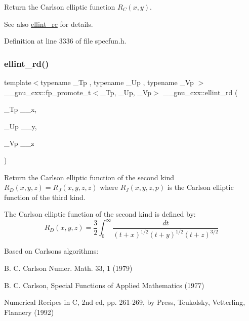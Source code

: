 Return the Carlson elliptic function $ R_C(x,y) $.

\begin{DoxySeeAlso}{See also}
\hyperlink{group__gnu__math__spec__func_ga7d3d42f5f71a74266be8aaca528056bf}{ellint\+\_\+rc} for details. 
\end{DoxySeeAlso}


Definition at line 3336 of file specfun.\+h.

\mbox{\label{group__gnu__math__spec__func_gad29dae6abc783c8fe952dba477e65309}} 
\subsubsection{\texorpdfstring{ellint\+\_\+rd()}{ellint\_rd()}}
{\footnotesize\ttfamily template$<$typename \+\_\+\+Tp , typename \+\_\+\+Up , typename \+\_\+\+Vp $>$ \\
\+\_\+\+\_\+gnu\+\_\+cxx\+::fp\+\_\+promote\+\_\+t$<$\+\_\+\+Tp, \+\_\+\+Up, \+\_\+\+Vp$>$ \+\_\+\+\_\+gnu\+\_\+cxx\+::ellint\+\_\+rd (\begin{DoxyParamCaption}\item[{\+\_\+\+Tp}]{\+\_\+\+\_\+x,  }\item[{\+\_\+\+Up}]{\+\_\+\+\_\+y,  }\item[{\+\_\+\+Vp}]{\+\_\+\+\_\+z }\end{DoxyParamCaption})\hspace{0.3cm}{\ttfamily [inline]}}

Return the Carlson elliptic function of the second kind $ R_D(x,y,z) = R_J(x,y,z,z) $ where $ R_J(x,y,z,p) $ is the Carlson elliptic function of the third kind.

The Carlson elliptic function of the second kind is defined by\+: \[ R_D(x,y,z) = \frac{3}{2} \int_0^\infty \frac{dt}{(t + x)^{1/2}(t + y)^{1/2}(t + z)^{3/2}} \]

Based on Carlson\textquotesingle{}s algorithms\+:
\begin{DoxyItemize}
\item B. C. Carlson Numer. Math. 33, 1 (1979)
\item B. C. Carlson, Special Functions of Applied Mathematics (1977)
\item Numerical Recipes in C, 2nd ed, pp. 261-\/269, by Press, Teukolsky, Vetterling, Flannery (1992)
\end{DoxyItemize}


